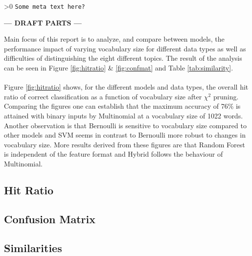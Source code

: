 \ifnum\printdraft>0
	\texttt{Some meta text here?}
\else
\begin{center}
	\textbf{--- DRAFT PARTS ---}
\end{center}
\fi

Main focus of this report is to analyze, and compare between models, the performance impact of varying vocabulary size for different data types as well as difficulties of distinguishing the eight different topics. The result of the analysis can be seen in Figure \ref{fig:hitratio} \& \ref{fig:confmat} and Table \ref{tab:similarity}.\\\\
Figure \ref{fig:hitratio} shows, for the different models and data types, the overall hit ratio of correct classification as a function of vocabulary size after $\chi^2$ pruning. Comparing the figures one can establish that the maximum accuracy of 76\% is attained with binary inputs by Multinomial at a vocabulary size of 1022 words. Another observation is that Bernoulli is sensitive to vocabulary size compared to other models and SVM seems in contrast to Bernoulli more robust to changes in vocabulary size. More results derived from these figures are that Random Forest is independent of the feature format and Hybrid follows the behaviour of Multinomial.

\onecolumn
\subsection{Hit Ratio}

\onecolumn
\subsection{Confusion Matrix}

\twocolumn
\subsection{Similarities}
